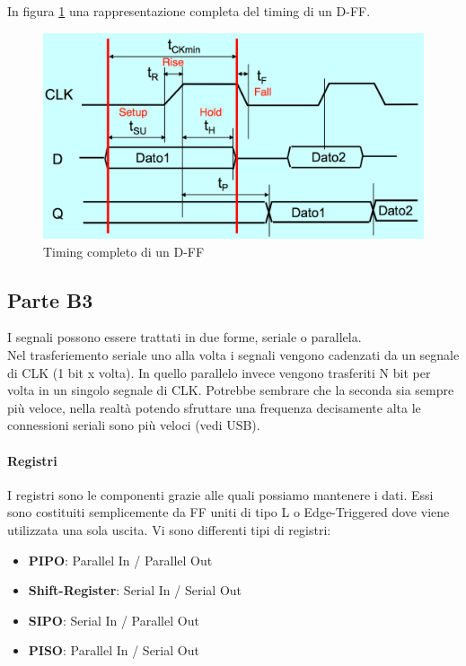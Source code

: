 \documentclass[12pt]{article}
\begin{document}
In figura \ref{fig:timingdff} una rappresentazione completa del timing di un D-FF.
\begin{figure}[!hp]
  \includegraphics[width=\textwidth]{images/timingdff.png}
  \caption{Timing completo di un D-FF}
  \label{fig:timingdff}
\end{figure}

\subsection{Parte B3}\label{b3}
I segnali possono essere trattati in due forme, seriale o parallela.\\
Nel trasferiemento seriale uno alla volta i segnali vengono cadenzati da un segnale di CLK (1 bit x volta). In quello parallelo invece vengono trasferiti N bit per volta in un singolo segnale di CLK. Potrebbe sembrare che la seconda sia sempre più veloce, nella realtà potendo sfruttare una frequenza decisamente alta le connessioni seriali sono più veloci (vedi USB).

\paragraph{Registri} I registri sono le componenti grazie alle quali possiamo mantenere i dati. Essi sono costituiti semplicemente da FF uniti di tipo L o Edge-Triggered dove viene utilizzata una sola uscita. Vi sono differenti tipi di registri:
\begin{itemize}
  \item \textbf{PIPO}: Parallel In / Parallel Out
  \item \textbf{Shift-Register}: Serial In / Serial Out
  \item \textbf{SIPO}: Serial In / Parallel Out
  \item \textbf{PISO}: Parallel In / Serial Out
\end{itemize}
\end{document}
